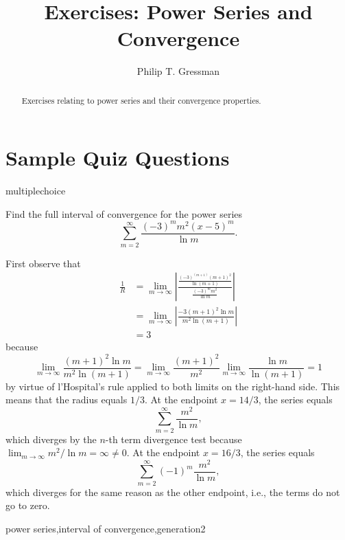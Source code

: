 \documentclass{ximera}
\title{Exercises: Power Series and Convergence}
\author{Philip T. Gressman}
\begin{document}
\begin{abstract}
Exercises relating to power series and their convergence properties.
\end{abstract}
\maketitle


\section*{Sample Quiz Questions}
\begin{question}[PowerSerInterval001]
\begin{type}
multiplechoice
\end{type}
Find the full interval of convergence for the power series \[\sum_{m=2}^{\infty} \frac{(-3)^mm^2(x - 5)^m }{\ln m}.\]
\begin{multiplechoice}
\choice{\(\displaystyle \left[\frac{14}{3},\frac{16}{3}\right)\)}
\choice{\(\displaystyle \left(2,8\right]\)}
\choice{\(\displaystyle \left[2,8\right]\)}
\choice{\(\displaystyle \left(-\infty,\infty\right)\)}
\end{multiplechoice}
\begin{feedback}
First observe that 
\[\begin{aligned}
\frac{1}{R} & = \lim_{m\rightarrow \infty} \left| \frac{\frac{(-3)^{(m+1)}{(m+1)}^2 }{\ln {(m+1)}} }{\frac{(-3)^mm^2 }{\ln m}} \right| \\
& = \lim_{m\rightarrow \infty} \left| \frac{-3{(m+1)}^2\ln m }{m^2\ln {(m+1)} } \right| \\
& = 3
\end{aligned}\]
because \[\lim_{m \rightarrow \infty} \frac{(m+1)^2 \ln m}{m^2 \ln (m+1)} = \lim_{m \rightarrow \infty} \frac{(m+1)^2}{m^2} \lim_{m \rightarrow \infty} \frac{\ln m}{\ln (m+1)} = 1\] by virtue of l'Hospital's rule applied to both limits on the right-hand side.
This means that the radius equals \(1/3\). At the endpoint \(x=14/3\), the series equals \[\sum_{m=2}^{\infty} \frac{m^2 }{\ln m },\] which diverges by the \(n\)-th term divergence test because \(\lim_{m \rightarrow \infty} m^{2} / \ln m = \infty \neq 0\). At the endpoint \(x=16/3\), the series equals \[\sum_{m=2}^{\infty} (-1)^m\frac{m^2 }{\ln m },\] which diverges for the same reason as the other endpoint, i.e., the terms do not go to zero.
\end{feedback}
\begin{keywords}
power series,interval of convergence,generation2
\end{keywords}
\end{question}
\end{document}
